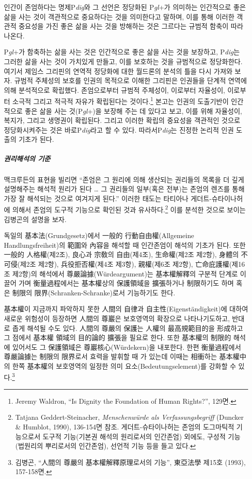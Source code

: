 인간이 존엄하다는 명제P\emph{dig}와 그 선언은 정당화된 P\emph{gl}+가 의미하는 인간적으로 좋은 삶을 사는 것이 객관적으로 중요하다는 것을 의미한다고 말하며, 이를 통해 이러한 객관적 중요성을 가진 좋은 삶을 사는 것을 방해하는 것은 그르다는 규범적 함축이 따라나온다.

P\emph{gl}+가 함축하는 삶을 사는 것은 인간적으로 좋은 삶을 사는 것을 보장하고, P\emph{dig}는 그러한 삶을 사는 것이 가치있게 만들고, 이를 보호하는 것을 규범적으로 정당화한다. 여기서 제임스 그리핀의 연역적 정당화에 대한 월드론의 분석의 틀을 다시 가져와 보자. 규범적 주체성의 보호를 인권의 목적으로 이해한 그리핀은 인권들을 단계적 연역에 의해 분석적으로 확립했다. 존엄으로부터 규범적 주체성이, 이로부터 자율성이, 이로부터 소극적 그리고 적극적 자유가 확립된다는 것이다.\footnote{Jeremy Waldron, ``Is Dignity the Foundation of Human Rights?'', 129면.} 본고는 인권의 도출기반이 인간적으로 좋은 삶을 사는 것(P\emph{gl}+)을 보장해 주는 데 있다고 보고, 이를 위해 자율성이, 복지가, 그리고 생명권이 확립된다. 그리고 이러한 확립의 중요성을 객관적인 것으로 정당화시켜주는 것은 바로P\emph{dig}라고 할 수 있다. 따라서P\emph{dig}는 진정한 논리적 인권 도출의 기초가 된다.

\subparagraph{권리해석의 기준}

맥크루든의 표현을 빌리면 ``존엄은 그 원리에 의해 생산되는 권리들의 목록을 더 깊게 설명해주는 해석적 원리가 된다 \ldots{} 그 권리들의 일부(혹은 전부)는 존엄의 렌즈를 통해 가장 잘 해석되는 것으로 여겨지게 된다.'' 이러한 태도는 타티아나 게더트-슈타이나허에 의해서 존엄의 도구적 기능으로 확인된 것과 유사하다.\footnote{Tatjana Geddert-Steinacher, \emph{Menschenwürde als Verfassungsbegriff} (Duncker \& Humblot, 1990), 136-154면 참조. 게더트-슈타이나허는 존엄의 도그마틱적 기능으로서 도구적 기능(기본권 해석의 원리로서의 인간존엄) 외에도, 구성적 기능(법원리의 뿌리로서의 인간존엄), 선언적 기능 등을 들고 있다.} 이를 분석한 것으로 보이는 김병곤의 설명을 보자.

독일의 基本法(Grundgesetz)에서 一般的 行動自由權(Allgemeine Handlungsfreiheit)의 範圍와 內容을 해석할 때 인간존엄이 해석의 기초가 된다. 또한 一般的 人格權(제2조), 良心과 宗敎의 自由(제4조), 生命權(제2조 제2항), 身體의 不可侵(제2조 제2항), 兵役拒否權(제4조 제3항), 親權(제6조 제2항), 亡命庇護權(제16조 제2항)의 해석에서 尊嚴論據(Würdeargument)는 基本權解釋의 구분적 단계로 이끌어 가며 衡量過程에서는 基本權상의 保護領域을 擴張하거나 制限하기도 하며 혹은 制限의 限界(Schranken-Schranke)로서 기능하기도 한다.

基本權이 지금까지 파악하지 못한 人間의 自律과 自主性(Eigenständigkeit)에 대하여 새로운 위험성이 등장하면 人間의 尊巖은 보호영역의 확장으로 나타나기도하고, 반대로 좁게 해석될 수도 있다. 人間의 尊嚴의 保護는 人權의 最高規範目的을 形成하고 그 점에서 基本權 領域의 目的論的 擴張을 필요로 한다. 또한 基本權의 制限的 해석에 있어서도 그 保護領域은 尊巖核心(Würdekern)을 내포한다. 한편 衡量過程에서 尊嚴論據는 制限의 限界로서 효력을 발휘할 때 가 있는데 이때는 相衝하는 基本權中의 한쪽 基本權의 보호영역의 일정한 의미 요소(Bedeutungselement)를 강화할 수 있다.\footnote{김병곤, ``人間의 尊嚴의 基本權解釋原理로서의 기능'', 東亞法學 제15호 (1993), 157-158면.}

